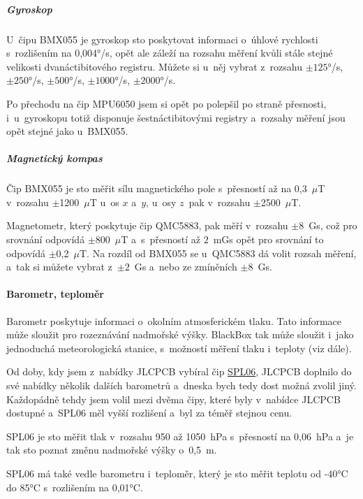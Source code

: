 \subparagraph*{Gyroskop}
\label{gyroskop}
U~čipu BMX055 je gyroskop sto poskytovat informaci o~úhlo\-vé rychlosti s~rozlišením na 0,004°\!/s,
 opět ale záleží na rozsahu měření kvůli stále stejné velikosti 
dvanáctibitového registru. 
Můžete si u~něj vybrat z~rozsahu $\pm125$°\!/s, $\pm250$°\!/s, $\pm500$°\!/s, $\pm1 000$°\!/s, $\pm2 000$°\!/s.

Po přechodu na čip MPU6050 jsem si opět po polepšil po straně přesnosti, i~u~gyroskopu totiž disponuje 
šestnáctibitovými registry a~rozsahy měření jsou opět stejné jako u~BMX055.

\subparagraph*{Magnetický kompas}
\label{magnetometr}
Čip BMX055 je sto měřit sílu magnetického pole s~přesností až na  0,3~$\mu$T 
v~rozsahu $\pm$1200~$\mu$T u~os $x$ a~$y$, u~osy $z$~pak v~rozsahu $\pm$2500~$\mu$T.

Magnetometr, který poskytuje čip QMC5883, pak měří v~rozsahu $\pm8$~Gs, což pro srovnání 
odpovídá $\pm$800~$\mu$T a~s~přesností až $2$~mGs opět pro srovnání to odpovídá $\pm$0,2~$\mu$T.
Na rozdíl od BMX055 se u~QMC5883 dá volit rozsah měření, a~tak si můžete vybrat z~$\pm2$~Gs 
a~nebo ze zmíněních $\pm8$~Gs.


\paragraph{Barometr, teploměr}
\label{barometr}
Barometr poskytuje informaci o~okolním atmosferickém tlaku. 
Tato informace může sloužit pro rozeznávání nadmořské výšky. 
BlackBox tak může sloužit i~jako jednoduchá meteorologická stanice, s~možností měření tlaku i~teploty (viz dále).

Od doby, kdy jsem z~nabídky JLCPCB vybíral čip 
\href{https://datasheet.lcsc.com/szlcsc/1907081118_Goertek-SPL06-007_C233787.pdf}{SPL06}, 
JLCPCB doplnilo do své nabídky několik dalších barometrů a~dneska bych tedy dost možná zvolil jiný. 
Každopádně tehdy jsem volil 
mezi dvěma čipy, které byly v~nabídce JLCPCB dostupné a~SPL06 měl vyšší rozlišení a~byl za téměř stejnou cenu.

SPL06 je sto měřit tlak v~rozsahu 950 až 1050~hPa s~přesností na 0,06~hPa 
a~je tak sto poznat změnu nadmořské výšky o~0,5~m.

SPL06 má také vedle barometru i~teploměr, který je sto měřit teplotu od -40°C do 85°C s~rozlišením na 0,01°C.

